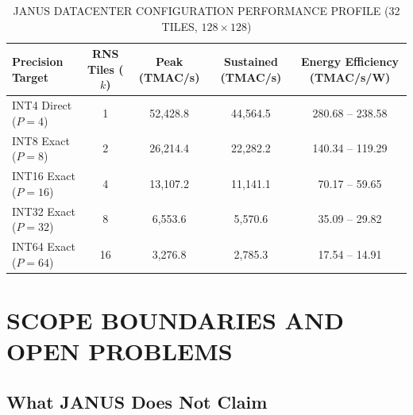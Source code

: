 \documentclass[journal]{IEEEtran}
\begin{document}
\begin{table}[htbp]
\centering
\small
\setlength{\tabcolsep}{3pt}
\caption{JANUS DATACENTER CONFIGURATION PERFORMANCE PROFILE (32 TILES, $128 \times 128$)}
\label{tab:table18}
\begin{tabular}{lcccc}
\toprule
Precision Target & RNS Tiles ($k$) & Peak (TMAC/s) & Sustained (TMAC/s) & Energy Efficiency (TMAC/s/W) \\
\midrule
INT4 Direct ($P=4$) & 1 & 52,428.8 & 44,564.5 & 280.68 -- 238.58 \\
INT8 Exact ($P=8$) & 2 & 26,214.4 & 22,282.2 & 140.34 -- 119.29 \\
INT16 Exact ($P=16$) & 4 & 13,107.2 & 11,141.1 & 70.17 -- 59.65 \\
INT32 Exact ($P=32$) & 8 & 6,553.6 & 5,570.6 & 35.09 -- 29.82 \\
INT64 Exact ($P=64$) & 16 & 3,276.8 & 2,785.3 & 17.54 -- 14.91 \\
\bottomrule
\end{tabular}
\end{table}

\section{SCOPE BOUNDARIES AND OPEN PROBLEMS}
\label{app:open_problems}

\subsection{\textbf{What JANUS Does Not Claim}}
\end{document}

